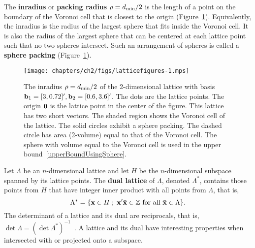 The \textbf{inradius} or \textbf{packing radius} $\rho = d_{\text{min}}/2$ is the length of a point on the boundary of the Voronoi cell that is closest to the origin (Figure~\ref{fig:bound_dmin}).  Equivalently, the inradius is the radius of the largest sphere that fits inside the Voronoi cell.  It is also the radius of the largest sphere that can be centered at each lattice point such that no two spheres intersect.  Such an arrangement of spheres is called a \textbf{sphere packing} (Figure~\ref{fig:bound_dmin}).

\begin{figure}[t]
\begin{center}   
\texttt{[image: chapters/ch2/figs/latticefigures-1.mps]}
\caption{The inradius $\rho = d_{\text{min}}/2$ of the 2-dimensional lattice with basis $\mathbf{b}_1 = [3,0.72]^\prime, \mathbf{b}_2 = [0.6,3.6]^\prime$. The dots are the lattice points.  The origin $\boldsymbol{0}$ is the lattice point in the center of the figure.  This lattice has two short vectors.  The shaded region shows the Voronoi cell of the lattice.  The solid circles exhibit a sphere packing.  The dashed circle has area (2-volume) equal to that of the Voronoi cell. The sphere with volume equal to the Voronoi cell is used in the upper bound~\ref{upperBoundUsingSphere}.}
\label{fig:bound_dmin}
\end{center}  
\end{figure} 


Let $\Lambda$ be an $n$-dimensional lattice and let $H$ be the $n$-dimensional subspace spanned by its lattice points. The \textbf{dual lattice} of $\Lambda$, denoted $\Lambda^*$, contains those points from $H$ that have integer inner product with all points from $\Lambda$, that is,
\[
\Lambda^* = \{ \mathbf{x}  \in H \; ; \; \mathbf{x}^\prime \bar{\mathbf{x}} \in {\mathbb Z} \text{ for all } \bar{\mathbf{x}} \in \Lambda \}.
\]
The determinant of a lattice and its dual are reciprocals, that is, $\det\Lambda = (\det\Lambda^*)^{-1}$~\cite[p. 10]{SPLAG}.  A lattice and its dual have interesting properties when intersected with or projected onto a subspace.  %

